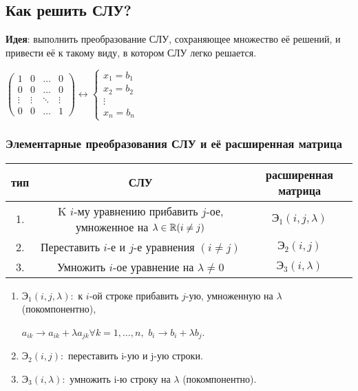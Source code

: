 \subsection{Как решить СЛУ?}

\textbf{Идея}: выполнить преобразование СЛУ, сохраняющее множество её решений, и привести её к такому виду, в котором СЛУ легко решается.

\begin{example}
    $\begin{pmatrix}
        1 & 0 & \dots & 0 \\
        0 & 0 & \dots & 0 \\
        \vdots & \vdots & \ddots & \vdots \\
        0 & 0 & \dots & 1
    \end{pmatrix} \leftrightarrow \begin{cases}
        x_1 = b_1 \\
        x_2 = b_2 \\ 
        \vdots \\ 
        x_n = b_n
    \end{cases}$
\end{example}

\subsubsection{Элементарные преобразования СЛУ и её расширенная матрица}

\begin{tabular}{c|c|c}
    тип & СЛУ & расширенная матрица \\
    \hline
    1. & K $i$-му уравнению прибавить $j$-ое, умноженное на $\lambda \in \mathbb{R}(i \neq j)$ & $\text{Э}_1(i, j, \lambda)$ \\
    2. & Переставить $i$-е и $j$-е уравнения $(i \neq j)$ & $\text{Э}_2(i, j)$ \\
    3. & Умножить $i$-ое уравнение на $\lambda \neq 0$ & $\text{Э}_3(i, \lambda)$
\end{tabular}

\begin{enumerate}
\item
    $\text{Э}_1(i, j, \lambda):$ к $i$-ой строке прибавить $j$-ую, умноженную на $\lambda$ (покомпонентно), 

    $a_{ik} \to a_{ik} + \lambda a_{jk} \forall k = 1, \dots, n,$
    $b_i \to b_i + \lambda b_j$.
    
\item
    $\text{Э}_2(i, j):$ переставить i-ую и j-ую строки.

\item
    $\text{Э}_3(i, \lambda):$ умножить i-ю строку на $\lambda$ (покомпонентно).
\end{enumerate}

